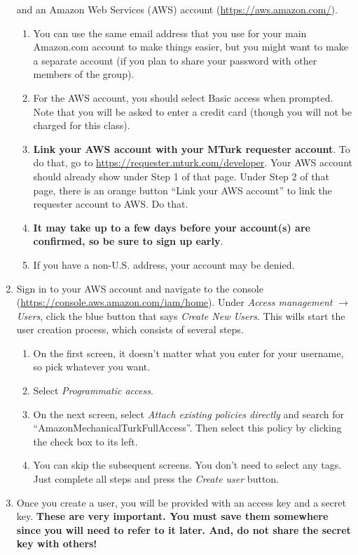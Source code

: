 \documentclass{article}
\begin{document}
\begin{enumerate}
    and an Amazon Web Services (AWS) account (\href{https://aws.amazon.com/}{https://aws.amazon.com/}). 
    \begin{enumerate}
        \item You can use the same email address that you use for your main Amazon.com account to make things easier, but you might want to make a separate account (if you plan to share your password with other members of the group). 
        \item For the AWS account, you should select Basic access when prompted. Note that you will be asked to enter a credit card (though you will not be charged for this class).
        \item \textbf{Link your AWS account with your MTurk requester account}. To do that, go to \url{https://requester.mturk.com/developer}. Your AWS account should already show under Step 1 of that page. Under Step 2 of that page, there is an orange button ``Link your AWS account'' to link the requester account to AWS. Do that.
        \item \textbf{It may take up to a few days before your account(s) are confirmed, so be sure to sign up early}.
        \item If you have a non-U.S. address, your account may be denied. 
    \end{enumerate}
    \item Sign in to your AWS account and navigate to the console (\href{https://console.aws.amazon.com/iam/home}{https://console.aws.amazon.com/iam/home}). Under {\em Access management} $\rightarrow$ {\em Users}, click the blue button that says {\em Create New Users}. This wills start the user creation process, which consists of several steps.
    \begin{enumerate}
    	\item On the first screen, it doesn’t matter what you enter for your username, so pick whatever you want. 
    	\item Select {\em Programmatic access}.
    	\item On the next screen, select {\em Attach existing policies directly} and search for ``AmazonMechanicalTurkFullAccess''. Then select this policy by clicking the check box to its left.
    	\item You can skip the subsequent screens. You don't need to select any tags. Just complete all steps and press the {\em Create user} button.
   \end{enumerate} 
    \item Once you create a user, you will be provided with an access key and a secret key. \textbf{These are very important. You must save them somewhere since you will need to refer to it later. And, do not share the secret key with others!}
   
\end{enumerate}
\end{document}
